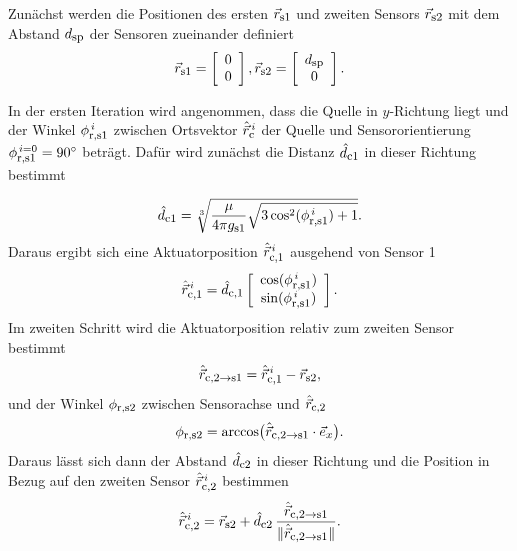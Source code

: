 Zunächst werden die Positionen des ersten $\vec{r}_{\textrm{\footnotesize{s1}}}$ und zweiten Sensors $\vec{r}_{\textrm{\footnotesize{s2}}}$ mit dem Abstand $d_{\textrm{\footnotesize{sp}}}$ der Sensoren zueinander definiert
    \begin{equation}
        \vec{r}_{\textrm{\footnotesize{s1}}} = \left[\begin{array}{c} 0\\ 0 \end{array}\right] ,\vec{r}_{\textrm{\footnotesize{s2}}} = \left[\begin{array}{c} d_{\textrm{\footnotesize{sp}}}\\ 0 \end{array}\right].
        \label{eq:AbsLocalposDef}
    \end{equation}

In der ersten Iteration wird angenommen, dass die Quelle in $y$-Richtung liegt und der Winkel $\phi_{\textrm{\footnotesize{r,s1}}}^{\,i}$ zwischen Ortsvektor $\hat{\vec{r}}^{\,i}_{\textrm{\footnotesize{c}}}$ der Quelle und Sensororientierung $\phi_{\textrm{\footnotesize{r,s1}}}^{\,i=0} = 90^\circ$ beträgt. Dafür wird zunächst die Distanz $\hat{d}_{\textrm{\footnotesize{c1}}}$ in dieser Richtung bestimmt

    \begin{equation}
        \hat{d}_{\textrm{\footnotesize{c1}}} = \sqrt[3]{\frac{\mu}{4\pi g_{\textrm{\footnotesize{s1}}}}\sqrt{3\cos^2(\phi_{\textrm{\footnotesize{r,s1}}}^{\,i})+1}}.
        \label{eq:AbsLocalDistS1}
    \end{equation}
    Daraus ergibt sich eine Aktuatorposition $\hat{\vec{r}}_{\textrm{\footnotesize{c,1}}}^{\,i}$ ausgehend von Sensor 1 
    \begin{equation}
        \hat{\vec{r}}_{\textrm{\footnotesize{c,1}}}^{\, i} = \hat{d}_{\textrm{\footnotesize{c,1}}} \left[\begin{array}{c} \cos(\phi_{\textrm{\footnotesize{r,s1}}}^{\,i})\\ \sin(\phi_{\textrm{\footnotesize{r,s1}}}^{\,i}) \end{array}\right].
        \label{eq:AbsLocalPosQ1}
    \end{equation}
    Im zweiten Schritt wird die Aktuatorposition relativ zum zweiten Sensor bestimmt 
    \begin{equation}
        \hat{\vec{r}}_{\textrm{\footnotesize{c,2$\rightarrow$s1}}} = \hat{\vec{r}}_{\textrm{\footnotesize{c,1}}}^{\,i} - \vec{r}_{\textrm{\footnotesize{s2}}},
    \end{equation} 
    und der Winkel $\phi_{\textrm{\footnotesize{r,s2}}}$ zwischen Sensorachse und $\hat{\vec{r}}_{\textrm{\footnotesize{c,2}}}$
    \begin{equation}
        \phi_{\textrm{\footnotesize{r,s2}}} = \arccos\bigl(\hat{\vec{r}}_{\textrm{\footnotesize{c,2$\rightarrow$s1}}}\cdot\vec{e}_{\textrm{\footnotesize{$x$}}}\bigr).
    \end{equation}
    Daraus lässt sich dann der Abstand $\hat{d}_{\textrm{\footnotesize{c2}}}$ in dieser Richtung und die Position in Bezug auf den zweiten Sensor $\hat{\vec{r}}_{\textrm{\footnotesize{c,2}}}^{\,i}$ bestimmen
    \begin{equation}
        \hat{\vec{r}}_{\textrm{\footnotesize{c,2}}}^{\,i} = \vec{r}_{\textrm{\footnotesize{s2}}} + \hat{d}_{\textrm{\footnotesize{c2}}}\, \frac{\hat{\vec{r}}_{\textrm{\footnotesize{c,2$\rightarrow$s1}}}}{\|\hat{\vec{r}}_{\textrm{\footnotesize{c,2$\rightarrow$s1}}}\|}.
    \end{equation} 

